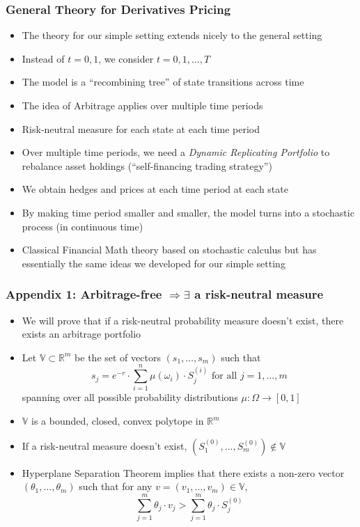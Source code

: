 \documentclass{beamer}
\begin{document}
\begin{frame}
\frametitle{General Theory for Derivatives Pricing}
\begin{itemize}
\item The theory for our simple setting extends nicely to the general setting
\item Instead of $t=0,1$, we consider $t=0, 1, \ldots, T$
\item The model is a ``recombining tree'' of state transitions across time
\item The idea of Arbitrage applies over multiple time periods
\item Risk-neutral measure for each state at each time period
\item Over multiple time periods, we need a {\em Dynamic Replicating Portfolio} to rebalance asset holdings (``self-financing trading strategy'')
\item We obtain hedges and prices at each time period at each state
\item By making time period smaller and smaller, the model turns into a stochastic process (in continuous time)
\item Classical Financial Math theory based on stochastic calculus but has essentially the same ideas we developed for our simple setting
\end{itemize}
\end{frame}

\appendix
\begin{frame}
\frametitle{Appendix 1: Arbitrage-free $\Rightarrow \exists$ a risk-neutral measure}
\begin{itemize}
\item We will prove that if a risk-neutral probability measure doesn't exist, there exists an arbitrage portfolio
\item Let $\mathbb{V} \subset \mathbb{R}^m$ be the set of vectors $(s_1, \ldots, s_m)$ such that
$$s_j = e^{-r} \cdot \sum_{i=1}^n \mu(\omega_i) \cdot S_j^{(i)} \mbox{ for all } j = 1, \ldots, m$$
spanning over all possible probability distributions $\mu: \Omega \rightarrow [0,1]$
\item $\mathbb{V}$ is a bounded, closed, convex polytope in $\mathbb{R}^m$
\item If a risk-neutral measure doesn't exist, $(S_1^{(0)}, \ldots, S_m^{(0)}) \not\in \mathbb{V}$
\item Hyperplane Separation Theorem implies that there exists a non-zero vector $(\theta_1, \ldots, \theta_m)$ such that
for any $v = (v_1, \ldots, v_m) \in \mathbb{V}$,
$$\sum_{j=1}^m \theta_j \cdot v_j > \sum_{j=1}^m \theta_j \cdot S_j^{(0)}$$
\end{itemize}
\end{frame}
\end{document}
